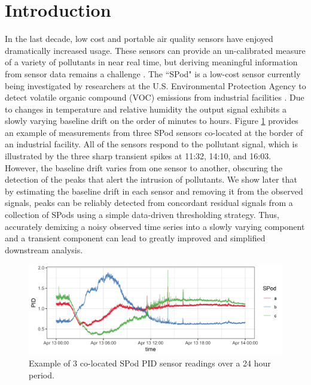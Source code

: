 \documentclass[aoas]{imsart}
\begin{document}
\begin{frontmatter}

\begin{keyword}
\end{keyword}

\end{frontmatter}


\section{Introduction}
\label{sec:intro}
In the last decade, low cost and portable air quality sensors have enjoyed dramatically increased usage. These sensors can provide an un-calibrated measure of a variety of pollutants in near real time, but deriving meaningful information from sensor data remains a challenge \citep{snyder2013changing}. The ``SPod" is a low-cost sensor currently being investigated by researchers at the U.S. Environmental Protection Agency to detect volatile organic compound (VOC) emissions from industrial facilities \citep{thoma2016south}. Due to changes in temperature and relative humidity the output signal exhibits a slowly varying baseline drift on the order of minutes to hours. Figure \ref{fig:raw_spod} provides an example of measurements from three SPod sensors co-located at the border of an industrial facility. All of the sensors respond to the pollutant signal, which is illustrated by the three sharp transient spikes at 11:32, 14:10, and 16:03. However, the baseline drift varies from one sensor to another, obscuring the detection of the peaks that alert the intrusion of pollutants. We show later that by estimating the baseline drift in each sensor and  removing it from the observed signals, peaks can be reliably detected from concordant residual signals from a collection of SPods using a simple data-driven thresholding strategy. Thus, accurately demixing a noisy observed time series into a slowly varying component and a transient component can lead to greatly improved and simplified downstream analysis. 

\begin{figure}[t!]
	\includegraphics[width = \linewidth]{Figures/uncorrected_data.png}
	\caption{Example of 3 co-located SPod PID sensor readings over a 24 hour period.}
	\label{fig:raw_spod}
\end{figure}
\end{document}
